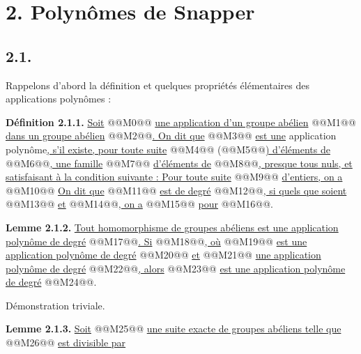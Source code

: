 
\section*{2. Polynômes de Snapper}

\subsection*{2.1.}
Rappelons d'abord la définition et quelques propriétés élémentaires des applications polynômes :

\textbf{Définition 2.1.1.} \uline{Soit} @@M0@@ \uline{une application d'un groupe abélien} @@M1@@ \uline{dans un groupe abélien} @@M2@@\uline{. On dit que} @@M3@@ \uline{est une} application polynôme\uline{, s'il existe, pour toute suite} @@M4@@ (@@M5@@\uline{) d'éléments de} @@M6@@\uline{, une famille} @@M7@@ \uline{d'éléments de} @@M8@@\uline{, presque tous nuls, et satisfaisant à la condition suivante : Pour toute suite} @@M9@@ \uline{d'entiers, on a}
@@M10@@
\uline{On dit que} @@M11@@ \uline{est de degré} @@M12@@\uline{, si quels que soient} @@M13@@ \uline{et} @@M14@@\uline{, on a}
@@M15@@
\uline{pour} @@M16@@.

\textbf{Lemme 2.1.2.} \uline{Tout homomorphisme de groupes abéliens est une application polynôme de degré} @@M17@@\uline{. Si} @@M18@@\uline{, où} @@M19@@ \uline{est une application polynôme de degré} @@M20@@ \uline{et} @@M21@@ \uline{une application polynôme de degré} @@M22@@\uline{, alors} @@M23@@ \uline{est une application polynôme de degré} @@M24@@.

Démonstration triviale.

\textbf{Lemme 2.1.3.} \uline{Soit}
@@M25@@
\uline{une suite exacte de groupes abéliens telle que} @@M26@@ \uline{est divisible par}
